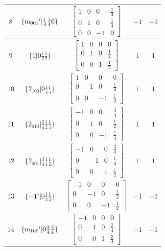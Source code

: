 \documentclass[fleqn,8pt]{jsarticle}
\begin{document}
\begin{longtable}{ccccc}
$ 8 $ & $ \{{\rm m}_{001}{}'|\frac{1}{4} \frac{1}{4} 0\} $ & $ \begin{bmatrix} 1 & 0 & 0 & \frac{1}{4} \\ 0 & 1 & 0 & \frac{1}{4} \\ 0 & 0 & -1 & 0 \end{bmatrix} $ & $ -1 $ & $ -1 $ \\ \hline
$ 9 $ & $ \{1|0 \frac{1}{2} \frac{1}{2}\} $ & $ \begin{bmatrix} 1 & 0 & 0 & 0 \\ 0 & 1 & 0 & \frac{1}{2} \\ 0 & 0 & 1 & \frac{1}{2} \end{bmatrix} $ & $ 1 $ & $ 1 $ \\ \hline
$ 10 $ & $ \{2{}_{100}|0 \frac{1}{4} \frac{1}{4}\} $ & $ \begin{bmatrix} 1 & 0 & 0 & 0 \\ 0 & -1 & 0 & \frac{1}{4} \\ 0 & 0 & -1 & \frac{1}{4} \end{bmatrix} $ & $ 1 $ & $ 1 $ \\ \hline
$ 11 $ & $ \{2{}_{010}|\frac{3}{4} \frac{1}{2} \frac{1}{4}\} $ & $ \begin{bmatrix} -1 & 0 & 0 & \frac{3}{4} \\ 0 & 1 & 0 & \frac{1}{2} \\ 0 & 0 & -1 & \frac{1}{4} \end{bmatrix} $ & $ 1 $ & $ 1 $ \\ \hline
$ 12 $ & $ \{2{}_{001}|\frac{3}{4} \frac{1}{4} \frac{1}{2}\} $ & $ \begin{bmatrix} -1 & 0 & 0 & \frac{3}{4} \\ 0 & -1 & 0 & \frac{1}{4} \\ 0 & 0 & 1 & \frac{1}{2} \end{bmatrix} $ & $ 1 $ & $ 1 $ \\ \hline
$ 13 $ & $ \{-1{}'|0 \frac{1}{2} \frac{1}{2}\} $ & $ \begin{bmatrix} -1 & 0 & 0 & 0 \\ 0 & -1 & 0 & \frac{1}{2} \\ 0 & 0 & -1 & \frac{1}{2} \end{bmatrix} $ & $ -1 $ & $ -1 $ \\ \hline
$ 14 $ & $ \{{\rm m}_{100}{}'|0 \frac{3}{4} \frac{3}{4}\} $ & $ \begin{bmatrix} -1 & 0 & 0 & 0 \\ 0 & 1 & 0 & \frac{3}{4} \\ 0 & 0 & 1 & \frac{3}{4} \end{bmatrix} $ & $ -1 $ & $ -1 $ \\ \hline

\end{longtable}
\end{document}

